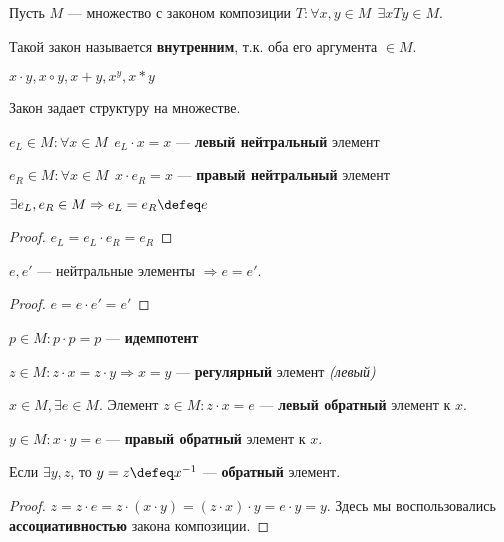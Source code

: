 Пусть \(M\) --- множество с законом композиции \(T : \forall x, y \in M \ \ \exists xTy \in M\).

\begin{remark}
    Такой закон называется \textbf{внутренним}, т.к. оба его аргумента \(\in M\).
\end{remark}

\begin{obozn}
    \(x \cdot y, x \circ y, x + y, x^y, x * y\)
\end{obozn}

Закон задает структуру на множестве.

\begin{definition}
    \(e_L \in M : \forall x \in M \ \ e_L \cdot x = x\) --- \textbf{левый нейтральный} элемент

    \(e_R \in M : \forall x \in M \ \ x \cdot e_R = x\) --- \textbf{правый нейтральный} элемент
\end{definition}

\begin{lemma}
    \(\exists e_L, e_R \in M \Rightarrow e_L = e_R \defeq e\)
\end{lemma}
\begin{proof}
    \(e_L = e_L \cdot e_R = e_R\)
\end{proof}

\begin{lemma}
    \(e, e'\) --- нейтральные элементы \( \Rightarrow e = e'\).
\end{lemma}
\begin{proof}
    \(e = e \cdot e' = e'\)
\end{proof}

\begin{definition}
    \(p \in M : p \cdot p = p\) --- \textbf{идемпотент}
\end{definition}

\begin{definition}
    \(z \in M : z \cdot x = z \cdot y \Rightarrow x = y\) --- \textbf{регулярный} элемент \textit{(левый)}
\end{definition}

\begin{definition}
    \(x \in M, \exists e \in M\). Элемент \(z \in M : z \cdot x = e\) --- \textbf{левый обратный} элемент к \(x\).

    \(y \in M : x \cdot y = e\) --- \textbf{правый обратный} элемент к \(x\).
\end{definition}

\begin{lemma}
    Если \(\exists y, z\), то \(y = z \defeq x^{-1}\) --- \textbf{обратный} элемент.
\end{lemma}
\begin{proof}
    \(z = z \cdot e = z \cdot (x \cdot y) = (z \cdot x) \cdot y = e \cdot y = y\). Здесь мы воспользовались \textbf{ассоциативностью} закона композиции.
\end{proof}

